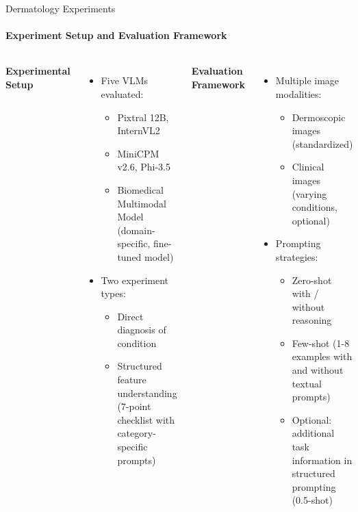\begin{frame}{Dermatology Experiments}
\framesubtitle{Experiment Setup and Evaluation Framework}
  \vspace{-1em}
  \begin{columns}[T]
    \column{\customcolumnwidth}
      \textbf{Experimental Setup}
      \begin{itemize}
        \item Five VLMs evaluated:
        \begin{itemize}
          \item Pixtral 12B, InternVL2
          \item MiniCPM v2.6, Phi-3.5
          \item Biomedical Multimodal Model (domain-specific, fine-tuned model)
        \end{itemize}
        \item Two experiment types:
        \begin{itemize}
          \item Direct diagnosis of condition
          \item Structured feature understanding (7-point checklist with category-specific prompts)
        \end{itemize}
      \end{itemize}
    \column{\customcolumnwidth}
      \textbf{Evaluation Framework}
      \begin{itemize}
        \item Multiple image modalities:
        \begin{itemize}
          \item Dermoscopic images (standardized)
          \item Clinical images (varying conditions, optional)
        \end{itemize}
        \item Prompting strategies:
        \begin{itemize}
          \item Zero-shot with / without reasoning
          \item Few-shot (1-8 examples with and without textual prompts)
          \item Optional: additional task information in structured prompting (0.5-shot)
        \end{itemize}
      \end{itemize}
    \end{columns}
\end{frame}

